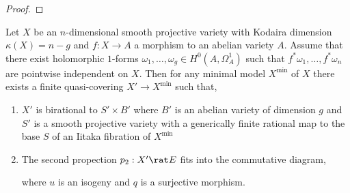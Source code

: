 \documentclass[12pt]{article}
\begin{document}
\begin{proof}
\end{proof}

\begin{theorem}
Let $X$ be an $n$-dimensional smooth projective variety with Kodaira dimension $\kappa(X) = n - g$ and $f : X \to A$ a morphism to an abelian variety $A$. Assume that there exist holomorphic $1$-forms $\omega_1, \dots, \omega_g \in H^0(A, \Omega^1_A)$ such that $f^* \omega_1, \dots, f^* \omega_n$ are pointwise independent on $X$. Then for any minimal model $X^{\min}$ of $X$ there exists a finite quasi-\etale covering $X' \to X^{\min}$ such that,
\begin{enumerate}
\item $X'$ is birational to $S' \times B'$ where $B'$ is an abelian variety of dimension $g$ and $S'$ is a smooth projective variety with a generically finite rational map to the base $S$ of an Iitaka fibration of $X^{\min}$

\item The second propection $p_2 : X' \rat E$ fits into the commutative diagram,
\begin{center}
\end{center}
where $u$ is an isogeny and $q$ is a surjective morphism.
\end{enumerate}
\end{theorem}
\end{document}
